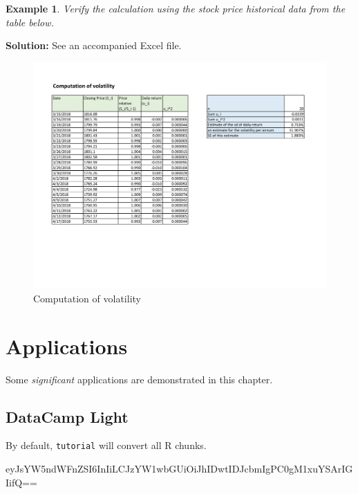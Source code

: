 \documentclass[
]{book}
\theoremstyle{definition}
\theoremstyle{definition}
\newtheorem{example}{Example}[chapter]
\theoremstyle{definition}
\theoremstyle{definition}
\theoremstyle{remark}
\begin{document}
\begin{example}
\emph{Verify the calculation using the stock price historical data from the
table below.}
\end{example}

\textbf{Solution:} See an accompanied Excel file.

\begin{figure}
\hypertarget{fig:volatility}{%
\centering
\includegraphics[width=7in,height=\textheight]{VolatilityEstimation2.pdf}
\caption{Computation of volatility}\label{fig:volatility}
}
\end{figure}

\hypertarget{applications}{%
\chapter{Applications}\label{applications}}

Some \emph{significant} applications are demonstrated in this chapter.

\hypertarget{datacamp-light}{%
\section{DataCamp Light}\label{datacamp-light}}

By default, \texttt{tutorial} will convert all R chunks.

eyJsYW5ndWFnZSI6InIiLCJzYW1wbGUiOiJhIDwtIDJcbmIgPC0gM1xuYSArIGIifQ==

  
\end{document}
